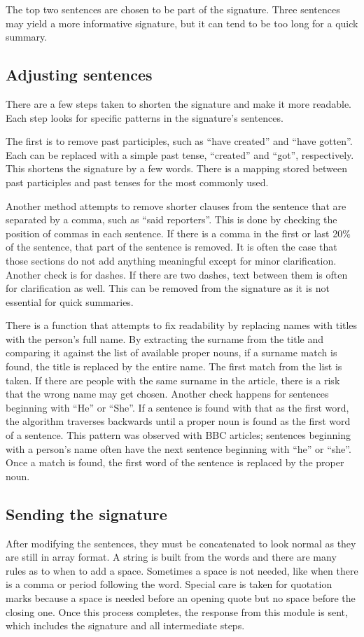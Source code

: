 \documentclass[11pt,titlepage]{report}
\begin{document}
The top two sentences are chosen to be part of the signature. Three sentences may yield a more informative signature, but it can tend to be too long for a quick summary.
\subsection{Adjusting sentences}
There are a few steps taken to shorten the signature and make it more readable. Each step looks for specific patterns in the signature's sentences. 

The first is to remove past participles, such as ``have created'' and ``have gotten''. Each can be replaced with a simple past tense, ``created'' and ``got'', respectively. This shortens the signature by a few words. There is a mapping stored between past participles and past tenses for the most commonly used. 

Another method attempts to remove shorter clauses from the sentence that are separated by a comma, such as ``said reporters''. This is done by checking the position of commas in each sentence. If there is a comma in the first or last 20\% of the sentence, that part of the sentence is removed. It is often the case that those sections do not add anything meaningful except for minor clarification. Another check is for dashes. If there are two dashes, text between them is often for clarification as well. This can be removed from the signature as it is not essential for quick summaries.

There is a function that attempts to fix readability by replacing names with titles with the person's full name. By extracting the surname from the title and comparing it against the list of available proper nouns, if a surname match is found, the title is replaced by the entire name. The first match from the list is taken. If there are people with the same surname in the article, there is a risk that the wrong name may get chosen. Another check happens for sentences beginning with ``He'' or ``She''. If a sentence is found with that as the first word, the algorithm traverses backwards until a proper noun is found as the first word of a sentence.  This pattern was observed with BBC articles; sentences beginning with a person's name often have the next sentence beginning with ``he'' or ``she''. Once a match is found, the first word of the sentence is replaced by the proper noun.
\subsection{Sending the signature}
After modifying the sentences, they must be concatenated to look normal as they are still in array format. A string is built from the words and there are many rules as to when to add a space. Sometimes a space is not needed, like when there is a comma or period following the word. Special care is taken for quotation marks because a space is needed before an opening quote but no space before the closing one. Once this process completes, the response from this module is sent, which includes the signature and all intermediate steps.
\end{document}
